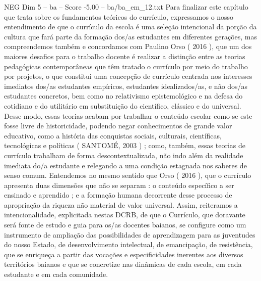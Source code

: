 \begin{textsample}{NEG Dim 5 – ba – Score -5.00 – ba/ba\_em\_12.txt}
Para finalizar este capítulo que trata sobre os fundamentos teóricos do currículo, expressamos o nosso entendimento de que o currículo da escola é uma seleção intencional da porção da cultura que fará parte da formação dos/as estudantes em diferentes gerações, mas compreendemos também e concordamos com Paulino Orso ( 2016 ), que um dos maiores desafios para o trabalho docente é realizar a distinção entre as teorias pedagógicas contemporâneas que têm tratado o currículo por meio do trabalho por projetos, o que constitui uma concepção de currículo centrada nos interesses imediatos dos/as estudantes empíricos, estudantes idealizados/as, e não dos/as estudantes concretos, bem como no relativismo epistemológico e na defesa do cotidiano e do utilitário em substituição do científico, clássico e do universal.
Desse modo, essas teorias acabam por trabalhar o conteúdo escolar como se este fosse livre de historicidade, podendo negar conhecimentos de grande valor educativo, como a história das conquistas sociais, culturais, científicas, tecnológicas e políticas ( SANTOMÉ, 2003 ) ; como, também, essas teorias de currículo trabalham de forma descontextualizada, não indo além da realidade imediata do/a estudante e relegando a uma condição estagnada nos saberes de senso comum.
Entendemos no mesmo sentido que Orso ( 2016 ), que o currículo apresenta duas dimensões que não se separam : o conteúdo específico a ser ensinado e aprendido ; e a formação humana decorrente desse processo de apropriação da riqueza não material de valor universal.
Assim, reiteramos a intencionalidade, explicitada nestas DCRB, de que o Currículo, que doravante será fonte de estudo e guia para os/as docentes baianos, se configure como um instrumento de ampliação das possibilidades de aprendizagem para as juventudes do nosso Estado, de desenvolvimento intelectual, de emancipação, de resistência, que se enriqueça a partir das vocações e especificidades inerentes aos diversos territórios baianos e que se concretize nas dinâmicas de cada escola, em cada estudante e em cada comunidade.

\end{textsample}
